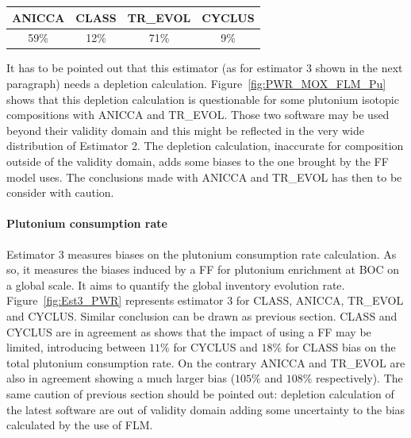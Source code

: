 \begin{table}[h]
	\begin{center}
		\begin{tabular}{|c||c||c||c|}
			\hline 
				ANICCA & CLASS & TR\_EVOL & CYCLUS \\
			\hline
				59\% & 12\% & 71\% & 9\% \\
			\hline
		\end{tabular}
	\end{center}
	\label{table:Est2_PWR}
\end{table}

It has to be pointed out that this estimator (as for estimator 3 shown in the
next paragraph) needs a depletion calculation.  Figure~\ref{fig:PWR_MOX_FLM_Pu}
shows that this depletion calculation is questionable for some plutonium
isotopic compositions with ANICCA and TR\_EVOL.  Those two software may be used
beyond their validity domain and this might be reflected in the very wide
distribution of Estimator 2. The depletion calculation, inaccurate for
composition outside of the validity domain, adds some biases to the one brought
by the \gls{FF} model uses. The conclusions made with ANICCA and TR\_EVOL has
then to be consider with caution.

\paragraph{Plutonium consumption rate}

Estimator 3 measures biases on the plutonium consumption rate calculation. As
so, it measures the biases induced by a \gls{FF} for plutonium enrichment at
\gls{BOC} on a global scale. It aims to quantify the global inventory evolution
rate.  Figure~\ref{fig:Est3_PWR} represents estimator 3 for CLASS, ANICCA,
TR\_EVOL and CYCLUS. Similar conclusion can be drawn as previous section. CLASS
and CYCLUS are in agreement as shows that the impact of using a \gls{FF} may be
limited, introducing between $11\%$ for CYCLUS and $18\%$ for CLASS bias on the total plutonium consumption rate. On the
contrary ANICCA and TR\_EVOL are also in agreement showing a much larger bias ($105\%$ and $108\%$ respectively).
The same caution of previous section should be pointed out: depletion
calculation of the latest software are out of validity domain adding some
uncertainty to the bias calculated by the use of \gls{FLM}.       

